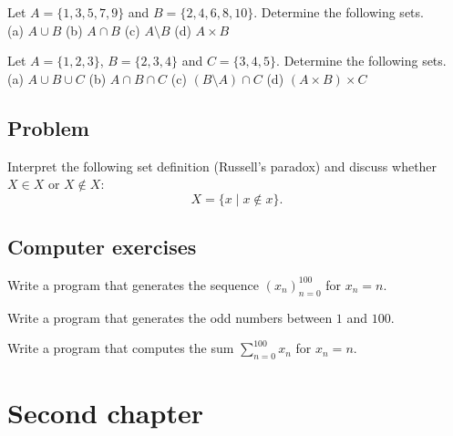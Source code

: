 \documentclass{tstextbook}
\begin{document}
\begin{exercise}
  Let $A = \{1, 3, 5, 7, 9\}$ and $B = \{2, 4, 6, 8, 10\}$.
  Determine the following sets. \\
  (a) $A \cup B$ \quad
  (b) $A \cap B$ \quad
  (c) $A \setminus B$ \quad
  (d) $A \times B$
\end{exercise}

\begin{exercise}
  Let $A = \{1, 2, 3\}$, $B = \{2, 3, 4\}$ and $C = \{3, 4, 5\}$.
  Determine the following sets. \\
  (a) $A \cup B \cup C$ \quad
  (b) $A \cap B \cap C$ \quad
  (c) $(B \setminus A) \cap C$ \quad
  (d) $(A \times B) \times C$
\end{exercise}

\section*{Problem}

\begin{problem}
  Interpret the following set definition (Russell's paradox) and discuss
  whether $X \in X$ or $X \notin X$:
  \begin{equation}
    X = \{x \mid x \notin x\}.
  \end{equation}
\end{problem}

\section*{Computer exercises}

\begin{programming}
  Write a program that generates the sequence $(x_n)_{n=0}^{100}$
  for $x_n = n$.
\end{programming}

\begin{programming}
  Write a program that generates the odd numbers between $1$ and $100$.
\end{programming}

\begin{programming}
  Write a program that computes the sum $\sum_{n=0}^{100} x_n$
  for $x_n = n$.
\end{programming}

\chapter{Second chapter}
\end{document}
